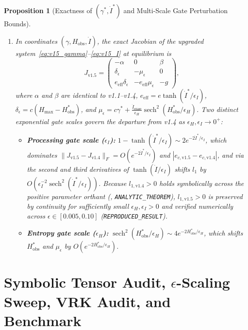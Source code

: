 \documentclass[11pt,a4paper]{article}
\newtheorem{proposition}[theorem]{Proposition}
\theoremstyle{remark}
\begin{document}
\begin{proposition}[Exactness of $(\gamma^*,\dot{I}^*)$ and Multi-Scale Gate Perturbation Bounds]
\begin{enumerate}
    \item In coordinates $(\gamma, H_{\text{obs}}, \dot{I})$, the exact Jacobian of the upgraded system~\eqref{eq:v15_gamma}--\eqref{eq:v15_I} at equilibrium is
    \begin{equation}
    \label{eq:J_v15}
    J_{\text{v1.5}} = \begin{pmatrix}
    -\alpha & 0 & \beta \\
    \delta_{\epsilon} & -\mu_{\epsilon} & 0 \\
    e_{\text{eff}}\delta_{\epsilon} & -e_{\text{eff}}\mu_{\epsilon} & -g
    \end{pmatrix},
    \end{equation}
    where $\alpha$ and $\beta$ are identical to v1.1--v1.4, $e_{\text{eff}} = e\tanh(\dot{I}^*/\epsilon_I)$, $\delta_{\epsilon} = c(H_{\max}-H_{\text{obs}}^*)$, and $\mu_{\epsilon} = c\gamma^* + \frac{\dot{I}_{\text{erase}}}{\epsilon_H}\operatorname{sech}^2(H_{\text{obs}}^*/\epsilon_H)$. Two distinct exponential gate scales govern the departure from v1.4 as $\epsilon_H, \epsilon_I \to 0^+$:
    \begin{itemize}
    \setlength{\itemsep}{0.5pt}
        \item \textbf{Processing gate scale ($\epsilon_I$):} $1 - \tanh(\dot{I}^*/\epsilon_I) \sim 2e^{-2\dot{I}^*/\epsilon_I}$, which dominates $\|J_{\text{v1.5}} - J_{\text{v1.4}}\|_F = O(e^{-2\dot{I}^*/\epsilon_I})$ and $|e_{c,\text{v1.5}} - e_{c,\text{v1.4}}|$, and via the second and third derivatives of $\tanh(\dot{I}/\epsilon_I)$ shifts $l_1$ by $O(\epsilon_I^{-2}\operatorname{sech}^2(\dot{I}^*/\epsilon_I))$. Because $l_{1,\text{v1.4}} > 0$ holds symbolically across the positive parameter orthant (\cite{upadhyay_v14}, \texttt{ANALYTIC\_THEOREM}), $l_{1,\text{v1.5}} > 0$ is preserved by continuity for sufficiently small $\epsilon_H, \epsilon_I > 0$ and verified numerically across $\epsilon \in [0.005, 0.10]$ (\texttt{REPRODUCED\_RESULT}).
        \item \textbf{Entropy gate scale ($\epsilon_H$):} $\operatorname{sech}^2(H_{\text{obs}}^*/\epsilon_H) \sim 4e^{-2H_{\text{obs}}^*/\epsilon_H}$, which shifts $H_{\text{obs}}^*$ and $\mu_\epsilon$ by $O(e^{-2H_{\text{obs}}^*/\epsilon_H})$.
    \end{itemize}
\end{enumerate}
\end{proposition}

\section{Symbolic Tensor Audit, $\epsilon$-Scaling Sweep, VRK Audit, and Benchmark}
\end{document}
